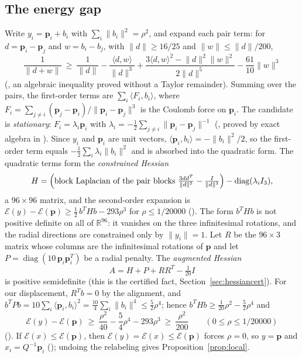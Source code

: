 \documentclass[11pt]{amsart}
\theoremstyle{definition}
\theoremstyle{remark}
\newcommand{\R}{\mathbb{R}}
\newcommand{\ip}[2]{\langle #1,#2\rangle}
\newcommand{\norm}[1]{\lVert #1\rVert}
\newcommand{\E}{\mathcal{E}}
\newcommand{\cand}{\mathbf{p}}
\begin{document}
\subsection{The energy gap}

Write $y_i=\cand_i+b_i$ with $\sum_i\norm{b_i}^{2}=\rho^{2}$, and expand each pair term: for $d=\cand_i-\cand_j$ and $w=b_i-b_j$, with $\norm{d}\ge16/25$ and $\norm{w}\le\norm{d}/200$,
\[
  \frac{1}{\norm{d+w}}\ \ge\ \frac{1}{\norm{d}}-\frac{\ip{d}{w}}{\norm{d}^{3}}+\frac{3\ip{d}{w}^{2}-\norm{d}^{2}\norm{w}^{2}}{2\norm{d}^{5}}-\frac{61}{10}\norm{w}^{3}
\]
(, an algebraic inequality proved without a Taylor remainder). Summing over the pairs, the first-order terms are $\sum_i\ip{F_i}{b_i}$, where $F_i=\sum_{j\ne i}(\cand_j-\cand_i)/\norm{\cand_i-\cand_j}^{3}$ is the Coulomb force on $\cand_i$. The candidate is \emph{stationary}: $F_i=\lambda_i\cand_i$ with $\lambda_i=-\frac12\sum_{j\ne i}\norm{\cand_i-\cand_j}^{-1}$ (, proved by exact algebra in ). Since $y_i$ and $\cand_i$ are unit vectors, $\ip{\cand_i}{b_i}=-\norm{b_i}^{2}/2$, so the first-order term equals $-\frac12\sum_i\lambda_i\norm{b_i}^{2}$ and is absorbed into the quadratic form. The quadratic terms form the \emph{constrained Hessian}
\[
  H=\Bigl(\text{block Laplacian of the pair blocks }\tfrac{3dd^{T}}{\norm{d}^{5}}-\tfrac{I}{\norm{d}^{3}}\Bigr)-\operatorname{diag}(\lambda_i I_3),
\]
a $96\times96$ matrix, and the second-order expansion is $\E(y)-\E(\cand)\ge\frac12\,b^{T}Hb-293\rho^{3}$ for $\rho\le1/20000$ (). The form $b^{T}Hb$ is not positive definite on all of $\R^{96}$: it vanishes on the three infinitesimal rotations, and the radial directions are constrained only by $\norm{y_i}=1$. Let $R$ be the $96\times3$ matrix whose columns are the infinitesimal rotations of $\cand$ and let $P=\operatorname{diag}(10\,\cand_i\cand_i^{T})$ be a radial penalty. The \emph{augmented Hessian}
\begin{equation}\label{eq:augmented}
  A=H+P+RR^{T}-\tfrac{1}{20}I
\end{equation}
is positive semidefinite (this is the certified fact, Section~\ref{sec:hessiancert}). For our displacement, $R^{T}b=0$ by the alignment, and $b^{T}Pb=10\sum_i\ip{\cand_i}{b_i}^{2}=\frac{10}{4}\sum_i\norm{b_i}^{4}\le\frac52\rho^{4}$; hence $b^{T}Hb\ge\frac{1}{20}\rho^{2}-\frac52\rho^{4}$ and
\[
  \E(y)-\E(\cand)\ \ge\ \frac{\rho^{2}}{40}-\frac54\rho^{4}-293\rho^{3}\ \ge\ \frac{\rho^{2}}{200}\qquad(0\le\rho\le1/20000)
\]
(). If $\E(x)\le\E(\cand)$, then $\E(y)=\E(x)\le\E(\cand)$ forces $\rho=0$, so $y=\cand$ and $x_i=Q^{-1}\cand_i$ (); undoing the relabeling gives Proposition~\ref{prop:local}.
\end{document}
